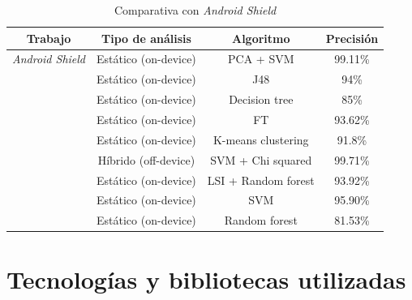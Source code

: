 \begin{table}[H]
\centering
\begin{tabular}{|c|c|c|c|}
\hline
\textbf{Trabajo}        & \textbf{Tipo de análisis}       & \textbf{Algoritmo} & \textbf{Precisión} \\ \hline
\textit{Android Shield} & Estático (on-device)              & PCA + SVM          & 99.11\%               \\ \hline
\hypersetup{citecolor=red}\cite{jiang}                       & Estático (on-device)              & J48                & 94\%               \\ \hline
\hypersetup{citecolor=red}\cite{giang}                       & Estático (on-device)              & Decision tree      & 85\%               \\ \hline
\hypersetup{citecolor=red}\cite{sigpid}                       & Estático (on-device)              & FT                 & 93.62\%            \\ \hline
\hypersetup{citecolor=red}\cite{aung}                       & Estático (on-device)              & K-means clustering & 91.8\%             \\ \hline
\hypersetup{citecolor=red}\cite{cloud}                       & Híbrido (off-device) & SVM + Chi squared  & 99.71\%            \\ \hline
\hypersetup{citecolor=red}\cite{kumar}                       & Estático (on-device) & LSI + Random forest  & 93.92\%            \\ \hline
\hypersetup{citecolor=red}\cite{garg}                       & Estático (on-device) & SVM  & 95.90\%            \\ \hline
\hypersetup{citecolor=red}\cite{todd}                       & Estático (on-device) & Random forest  & 81.53\%            \\ \hline
\end{tabular}
\caption{Comparativa con \textit{Android Shield}}
\label{tab:comp-as}
\end{table}

\section{Tecnologías y bibliotecas utilizadas}

